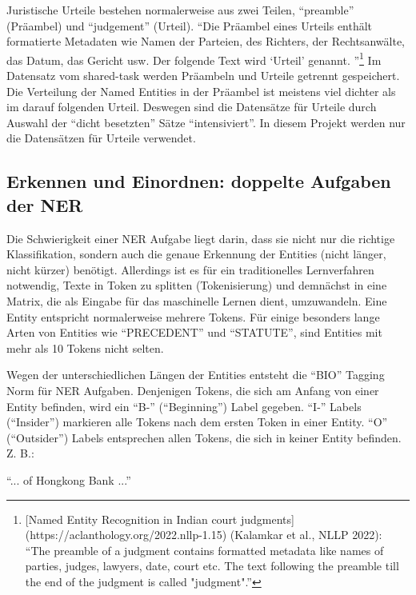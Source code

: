 \documentclass[paper=A4, ngerman, fontsize=12pt]{article}
\begin{document}
	\indent
	Juristische Urteile bestehen normalerweise aus zwei Teilen, \enquote{preamble} (Präambel) und \enquote{judgement} (Urteil). \enquote{Die Präambel eines Urteils enthält formatierte Metadaten wie Namen der Parteien, des Richters, der Rechtsanwälte, das Datum, das Gericht usw. Der folgende Text wird \enquote{Urteil} genannt. }\footnote{[Named Entity Recognition in Indian court judgments](https://aclanthology.org/2022.nllp-1.15) (Kalamkar et al., NLLP 2022): \enquote{The preamble of a judgment contains formatted metadata like names of parties, judges, lawyers, date, court etc. The text following the preamble till the end of the judgment is called "judgment".}} Im Datensatz vom shared-task werden Präambeln und Urteile getrennt gespeichert. Die Verteilung der Named Entities in der Präambel ist meistens viel dichter als im darauf folgenden Urteil. Deswegen sind die Datensätze für Urteile durch Auswahl der \enquote{dicht besetzten} Sätze \enquote{intensiviert}. In diesem Projekt werden nur die Datensätzen für Urteile verwendet. 
	
	\subsection{Erkennen und Einordnen: doppelte Aufgaben der NER}
	\noindent
	Die Schwierigkeit einer NER Aufgabe liegt darin, dass sie nicht nur die richtige Klassifikation, sondern auch die genaue Erkennung der Entities (nicht länger, nicht kürzer) benötigt. Allerdings ist es für ein traditionelles Lernverfahren notwendig, Texte in Token zu splitten (Tokenisierung) und demnächst in eine Matrix, die als Eingabe für das maschinelle Lernen dient, umzuwandeln. Eine Entity entspricht normalerweise mehrere Tokens. Für einige besonders lange Arten von Entities wie \enquote{PRECEDENT} und \enquote{STATUTE}, sind Entities mit mehr als 10 Tokens  nicht selten. 
	
	\indent
	Wegen der unterschiedlichen Längen der Entities entsteht die \enquote{BIO} Tagging Norm für NER Aufgaben. Denjenigen Tokens, die sich am Anfang von einer Entity befinden, wird ein \enquote{B-} (\enquote{Beginning}) Label gegeben. \enquote{I-} Labels (\enquote{Insider}) markieren alle Tokens nach dem ersten Token in einer Entity. \enquote{O} (\enquote{Outsider}) Labels entsprechen allen Tokens, die sich in keiner Entity befinden. Z. B.:
	
	\indent
	\enquote{... of Hongkong Bank ...}
	
	
\end{document}

